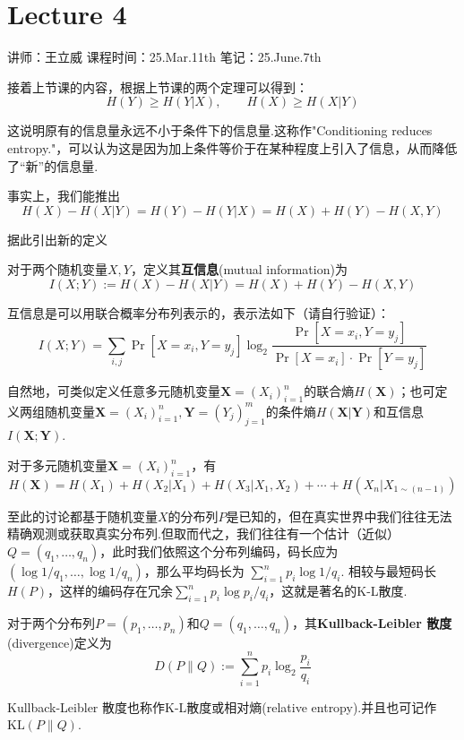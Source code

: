 \chapter{Lecture 4}

\begin{center}
    讲师：王立威 \qquad
    课程时间：25.Mar.11th \qquad 
    笔记：25.June.7th
\end{center}

\bigskip

接着上节课的内容，根据上节课的两个定理可以得到：
\[
H(Y) \ge H(Y|X), \qquad H(X) \ge H(X|Y)
\]

这说明原有的信息量永远不小于条件下的信息量.这称作"Conditioning reduces entropy."，可以认为这是因为加上条件等价于在某种程度上引入了信息，从而降低了“新”的信息量. 

事实上，我们能推出 
\[
H(X) - H(X|Y) = H(Y) - H(Y|X) = H(X) + H(Y) - H(X,Y)
\]

据此引出新的定义 
\begin{definition}[互信息]
    对于两个随机变量$X,Y$，定义其\textbf{互信息}(mutual information)为 
    \[
    I(X;Y) := H(X) - H(X|Y) = H(X) + H(Y) - H(X,Y)
    \]
\end{definition}

互信息是可以用联合概率分布列表示的，表示法如下（请自行验证）：
\[
I(X; Y) = \sum_{i,j} \Pr[X=x_i, Y=y_j] \log_2 \dfrac{\Pr[X=x_i, Y=y_j]}{\Pr[X=x_i]\cdot \Pr[ Y=y_j]}
\]

自然地，可类似定义任意多元随机变量$\boldsymbol{X}=(X_i)_{i=1}^n$的联合熵$H(\boldsymbol{X})$；也可定义两组随机变量$\boldsymbol{X}=(X_i)_{i=1}^n, \boldsymbol{Y}=(Y_j)_{j=1}^m$的条件熵$H(\boldsymbol{X}|\boldsymbol{Y})$和互信息$I(\boldsymbol{X};\boldsymbol{Y})$. 

\begin{theorem}
    对于多元随机变量$\boldsymbol{X}=(X_i)_{i=1}^n$，有 
    \[
    H(\boldsymbol{X}) = H(X_1) + H(X_2|X_1) + H(X_3|X_1,X_2) + \cdots + H(X_n|X_{1\sim (n-1)})
    \]
\end{theorem}

至此的讨论都基于随机变量$X$的分布列$P$是已知的，但在真实世界中我们往往无法精确观测或获取真实分布列.但取而代之，我们往往有一个估计（近似）$Q = (q_1,\dots, q_n)$，此时我们依照这个分布列编码，码长应为$(\log 1/q_1,\dots, \log 1/q_n)$，那么平均码长为 $\sum_{i=1}^n p_i \log 1/q_i$. 相较与最短码长$H(P)$，这样的编码存在冗余$\sum_{i=1}^n p_i \log p_i/q_i$，这就是著名的K-L散度. 

\begin{definition}
    对于两个分布列$P=(p_1,\dots, p_n)$和$Q=(q_1,\dots, q_n)$，其\textbf{Kullback-Leibler 散度}(divergence)定义为 
    \[
    D(P \| Q) := \sum_{i=1}^n p_i \log_2 \dfrac{p_i}{q_i}
    \]

    Kullback-Leibler 散度也称作K-L散度或相对熵(relative entropy).并且也可记作$\text{KL}(P\| Q)$.
\end{definition}

